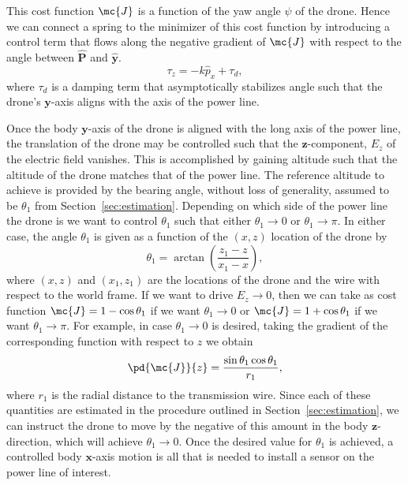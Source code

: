 This cost function $\mc{J}$ is a function of the yaw angle $\psi$ of the drone.
Hence we can connect a spring to the minimizer of this cost function by
introducing a control term that flows along the negative gradient of $\mc{J}$
with respect to the angle between $\hat{\bm{P}}$ and $\hat{\bm{y}}$. \[\tau_z
= -k\hat{p}_x + \tau_d, \] where $\tau_d$ is a damping term that asymptotically
stabilizes angle such that the drone's $\bm{y}$-axis aligns with the axis of the
power line.

Once the body $\bm{y}$-axis of the drone is aligned with the long axis of the
power line, the translation of the drone may be controlled such that the
$\bm{z}$-component, $E_z$ of the electric field vanishes. This is accomplished
by gaining altitude such that the altitude of the drone matches that of the
power line. The reference altitude to achieve is provided by the bearing angle,
without loss of generality, assumed to be $\theta_1$ from
Section~\ref{sec:estimation}. Depending on which side of the power line the
drone is we want to control $\theta_1$ such that either $\theta_1 \rightarrow 0$
or $\theta_1 \rightarrow \pi$. In either case, the angle $\theta_1$ is given as
a function of the $(x, z)$ location of the drone by \[\theta_1 = \arctan{\left(
\frac{z_1 - z}{x_1-x} \right)}, \] where $(x, z)$ and $(x_1, z_1)$ are the
locations of the drone and the wire with respect to the world frame. If we want
to drive $E_z \rightarrow 0$, then we can take as cost function $\mc{J} = 1 -
\cos{\theta_1}$ if we want $\theta_1 \rightarrow 0$ or $\mc{J} =
1+\cos{\theta_1}$ if we want $\theta_1 \rightarrow \pi$. For example, in case
$\theta_1 \rightarrow 0$ is desired, taking the gradient of the corresponding
function with respect to $z$ we obtain \[ \pd{\mc{J}}{z} =
\frac{\sin{\theta_1}\cos{\theta_1}}{r_1}, \] where $r_1$ is the radial distance
to the transmission wire. Since each of these quantities are estimated in the
procedure outlined in Section~\ref{sec:estimation}, we can instruct the drone to
move by the negative of this amount in the body $\bm{z}$-direction, which will
achieve $\theta_1 \rightarrow 0$. Once the desired value for $\theta_1$ is
achieved, a controlled body $\bm{x}$-axis motion is all that is needed to
install a sensor on the power line of interest.

